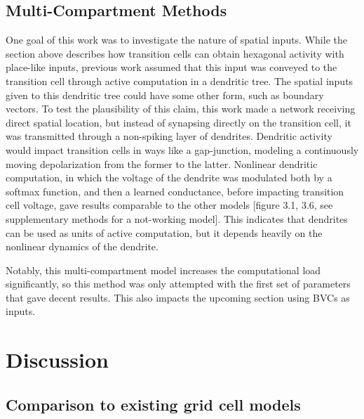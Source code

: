 \documentclass{article}
\begin{document}
    \subsection{Multi-Compartment Methods}
    One goal of this work was to investigate the nature of spatial inputs. While the section above describes how transition cells can obtain hexagonal activity with place-like inputs, previous work assumed that this input was conveyed to the transition cell through active computation in a dendritic tree. The spatial inputs given to this dendritic tree could have some other form, such as boundary vectors. To test the plausibility of this claim, this work made a network receiving direct spatial location, but instead of synapsing directly on the transition cell, it was transmitted through a non-spiking layer of dendrites. Dendritic activity would impact transition cells in ways like a gap-junction, modeling a continuously moving depolarization from the former to the latter. Nonlinear dendritic computation, in which the voltage of the dendrite was modulated both by a softmax function, and then a learned conductance, before impacting transition cell voltage, gave results comparable to the other models [figure 3.1, 3.6, see supplementary methods for a not-working model]. This indicates that dendrites can be used as units of active computation, but it depends heavily on the nonlinear dynamics of the dendrite.

    Notably, this multi-compartment model increases the computational load significantly, so this method was only attempted with the first set of parameters that gave decent results. This also impacts the upcoming section using BVCs as inputs.

    \section{Discussion}

    \subsection{Comparison to existing grid cell models}
\end{document}
